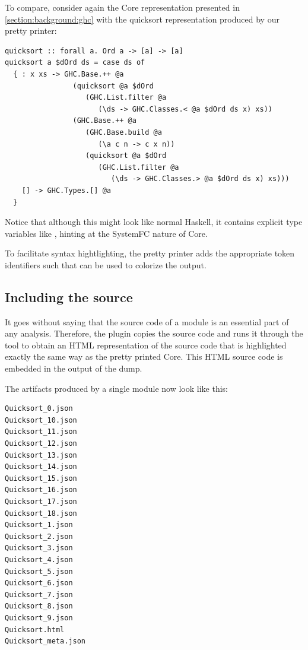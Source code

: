 To compare, consider again the Core representation presented in \cref{section:background:ghc} with the quicksort
representation produced by our pretty printer:

\begin{listing}[H]
\begin{verbatim}
quicksort :: forall a. Ord a -> [a] -> [a]
quicksort a $dOrd ds = case ds of
  { : x xs -> GHC.Base.++ @a
                (quicksort @a $dOrd
                   (GHC.List.filter @a
                      (\ds -> GHC.Classes.< @a $dOrd ds x) xs))
                (GHC.Base.++ @a
                   (GHC.Base.build @a
                      (\a c n -> c x n))
                   (quicksort @a $dOrd
                      (GHC.List.filter @a
                         (\ds -> GHC.Classes.> @a $dOrd ds x) xs)))
    [] -> GHC.Types.[] @a
  }
\end{verbatim}
\end{listing}

Notice that although this might look like normal Haskell, it contains explicit type variables like
, hinting at the SystemFC nature of Core. 

To facilitate syntax hightlighting, the pretty printer adds the appropriate token identifiers such that 
 \cite{pygments} can be used to colorize the output.


\subsection{Including the source}
It goes without saying that the source code of a module is an essential part of any analysis. Therefore,
the plugin copies the source code and runs it through the  \cite{pygments} tool to obtain
an HTML representation of the source code that is highlighted exactly the same way as the pretty printed Core.
This HTML source code is embedded in the output of the dump.

The artifacts produced by a single module now look like this:

\begin{listing}[H]
\begin{verbatim}
Quicksort_0.json
Quicksort_10.json
Quicksort_11.json
Quicksort_12.json
Quicksort_13.json
Quicksort_14.json
Quicksort_15.json
Quicksort_16.json
Quicksort_17.json
Quicksort_18.json
Quicksort_1.json
Quicksort_2.json
Quicksort_3.json
Quicksort_4.json
Quicksort_5.json
Quicksort_6.json
Quicksort_7.json
Quicksort_8.json
Quicksort_9.json
Quicksort.html
Quicksort_meta.json
\end{verbatim}
\end{listing}


